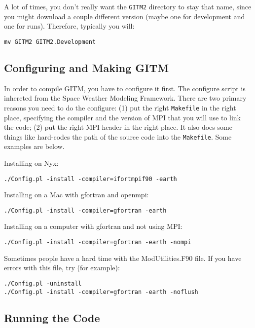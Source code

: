 A lot of times, you don't really want the {\tt GITM2} directory to
stay that name, since you might download a couple different version
(maybe one for development and one for runs).  Therefore, typically
you will:
\begin{verbatim}
mv GITM2 GITM2.Development
\end{verbatim}

\subsection{Configuring and Making GITM}

In order to compile GITM, you have to configure it first.  The
configure script is inhereted from the Space Weather Modeling
Framework.  There are two primary reasons you need to do the
configure: (1) put the right {\tt Makefile} in the right place,
specifying the compiler and the version of MPI that you will use to
link the code; (2) put the right MPI header in the right place.  It
also does some things like hard-codes the path of the source code into
the {\tt Makefile}. Some examples are below.

Installing on Nyx:
\begin{verbatim}
./Config.pl -install -compiler=ifortmpif90 -earth
\end{verbatim}

Installing on a Mac with gfortran and openmpi:
\begin{verbatim}
./Config.pl -install -compiler=gfortran -earth
\end{verbatim}

Installing on a computer with gfortran and not using MPI:
\begin{verbatim}
./Config.pl -install -compiler=gfortran -earth -nompi
\end{verbatim}

Sometimes people have a hard time with the ModUtilities.F90 file.  If
you have errors with this file, try (for example):
\begin{verbatim}
./Config.pl -uninstall
./Config.pl -install -compiler=gfortran -earth -noflush
\end{verbatim}

\subsection{Running the Code}

